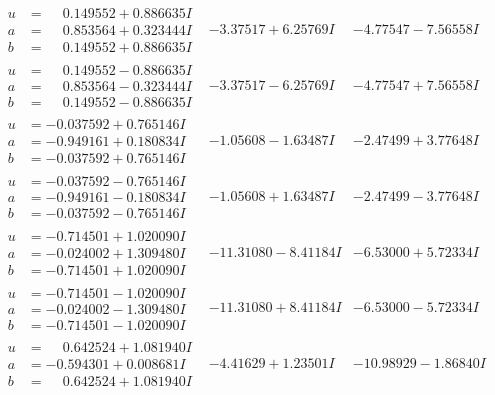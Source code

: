 \documentclass[1p]{elsarticle_modified}
\theoremstyle{definition}
\begin{document}
$$\begin{array}{c|c|c}
\begin{aligned}
u &= \phantom{-}0.149552 + 0.886635 I \\
a &= \phantom{-}0.853564 + 0.323444 I \\
b &= \phantom{-}0.149552 + 0.886635 I\end{aligned}
 & -3.37517 + 6.25769 I & -4.77547 - 7.56558 I \\ \hline\begin{aligned}
u &= \phantom{-}0.149552 - 0.886635 I \\
a &= \phantom{-}0.853564 - 0.323444 I \\
b &= \phantom{-}0.149552 - 0.886635 I\end{aligned}
 & -3.37517 - 6.25769 I & -4.77547 + 7.56558 I \\ \hline\begin{aligned}
u &= -0.037592 + 0.765146 I \\
a &= -0.949161 + 0.180834 I \\
b &= -0.037592 + 0.765146 I\end{aligned}
 & -1.05608 - 1.63487 I & -2.47499 + 3.77648 I \\ \hline\begin{aligned}
u &= -0.037592 - 0.765146 I \\
a &= -0.949161 - 0.180834 I \\
b &= -0.037592 - 0.765146 I\end{aligned}
 & -1.05608 + 1.63487 I & -2.47499 - 3.77648 I \\ \hline\begin{aligned}
u &= -0.714501 + 1.020090 I \\
a &= -0.024002 + 1.309480 I \\
b &= -0.714501 + 1.020090 I\end{aligned}
 & -11.31080 - 8.41184 I & -6.53000 + 5.72334 I \\ \hline\begin{aligned}
u &= -0.714501 - 1.020090 I \\
a &= -0.024002 - 1.309480 I \\
b &= -0.714501 - 1.020090 I\end{aligned}
 & -11.31080 + 8.41184 I & -6.53000 - 5.72334 I \\ \hline\begin{aligned}
u &= \phantom{-}0.642524 + 1.081940 I \\
a &= -0.594301 + 0.008681 I \\
b &= \phantom{-}0.642524 + 1.081940 I\end{aligned}
 & -4.41629 + 1.23501 I & -10.98929 - 1.86840 I \\ \hline\begin{aligned}

\end{aligned}
\end{array}$$
\end{document}
